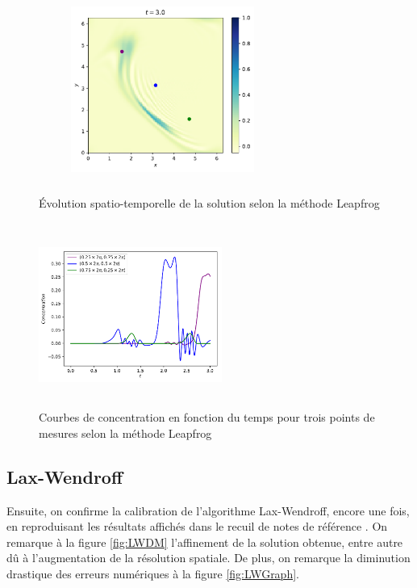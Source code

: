 \documentclass{article}
\begin{document}
\begin{figure}[H]
\begin{subfigure}{0.5\linewidth}
		\includegraphics[width=6cm, height=6cm]{img/LFDM3s.pdf}
		\centering
		\caption{}
		\label{fig:tau}
	\end{subfigure}
	\caption{Évolution spatio-temporelle de la solution selon la méthode Leapfrog}
	\label{fig:LFDM}
\end{figure}

\begin{figure}[H]
	\includegraphics[width=6cm, height=6cm]{img/LFGraph.pdf}
	\centering
	\caption{Courbes de concentration en fonction du temps pour trois points de mesures selon la méthode Leapfrog}
	\label{fig:LFGraph}
\end{figure}

\subsection{Lax-Wendroff}\label{sec:LaxWendroff}

Ensuite, on confirme la calibration de l'algorithme Lax-Wendroff, encore une fois, en reproduisant les résultats affichés dans le recuil de notes de référence \cite{notes_cours}. On remarque à la figure \ref{fig:LWDM} l'affinement de la solution obtenue, entre autre dû à l'augmentation de la résolution spatiale. De plus, on remarque la diminution drastique des erreurs numériques à la figure \ref{fig:LWGraph}.
\end{document}
